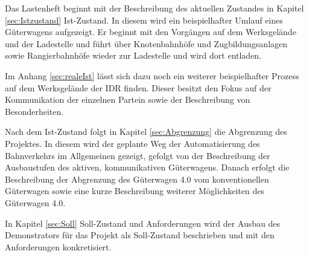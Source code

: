 Das Lastenheft beginnt mit der Beschreibung des aktuellen Zustandes in Kapitel \ref{sec:Istzustand} Ist-Zustand. In diesem wird ein beispielhafter Umlauf eines Güterwagens aufgezeigt. Er beginnt mit den Vorgängen auf dem Werksgelände und der Ladestelle und führt über Knotenbahnhöfe und Zugbildungsanlagen sowie Rangierbahnhöfe wieder zur Ladestelle und wird dort entladen.\par
Im Anhang \ref{sec:realeIst} lässt sich dazu noch ein weiterer beispielhafter Prozess auf dem Werksgelände der IDR finden. Dieser besitzt den Fokus auf der Kommunikation der einzelnen Partein sowie der Beschreibung von Besonderheiten.\par
Nach dem Ist-Zustand folgt in Kapitel \ref{sec:Abgrenzung} die Abgrenzung des Projektes. In diesem wird der geplante Weg der Automatisierung des Bahnverkehrs im Allgemeinen gezeigt, gefolgt von der Beschreibung der Ausbaustufen des aktiven, kommunikativen Güterwagens. Danach erfolgt die Beschreibung der Abgrenzung des Güterwagen 4.0 vom konventionellen Güterwagen sowie eine kurze Beschreibung weiterer Möglichkeiten des Güterwagen 4.0.\par
In Kapitel \ref{sec:Soll} Soll-Zustand und Anforderungen wird der Ausbau des Demonstrators für das Projekt als Soll-Zustand beschrieben und mit den Anforderungen konkretisiert.
